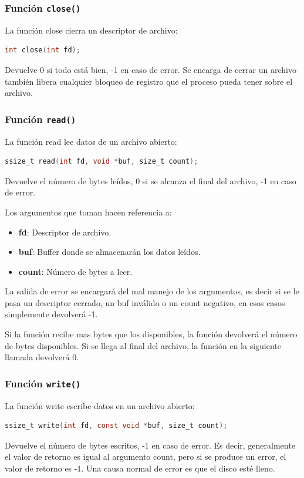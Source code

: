 \documentclass{article}
\begin{document}
\subsubsection{Función \texttt{close()}}
La función close cierra un descriptor de archivo:
\begin{lstlisting}[language=C]
    int close(int fd);
\end{lstlisting}
Devuelve 0 si todo está bien, -1 en caso de error. Se encarga de cerrar un archivo también libera cualquier bloqueo de registro que el proceso pueda tener sobre el archivo.

\subsubsection{Función \texttt{read()}}
La función read lee datos de un archivo abierto:
\begin{lstlisting}[language=C]
    ssize_t read(int fd, void *buf, size_t count);
\end{lstlisting}
Devuelve el número de bytes leídos, 0 si se alcanza el final del archivo, -1 en caso de error.

Los argumentos que toman hacen referencia a:
\begin{itemize}
    \item \textbf{fd}: Descriptor de archivo.
    \item \textbf{buf}: Buffer donde se almacenarán los datos leídos.
    \item \textbf{count}: Número de bytes a leer.
\end{itemize}
La salida de error se encargará del mal manejo de los argumentos, es decir si se le pasa un descriptor cerrado, un buf inválido o un count negativo, en esos casos simplemente devolverá -1.

Si la función recibe mas bytes que los disponibles, la función devolverá el número de bytes disponibles. Si se llega al final del archivo, la función en la siguiente llamada devolverá 0.

\subsubsection{Función \texttt{write()}}
La función write escribe datos en un archivo abierto:
\begin{lstlisting}[language=C]
    ssize_t write(int fd, const void *buf, size_t count);
\end{lstlisting}
Devuelve el número de bytes escritos, -1 en caso de error. Es decir, generalmente el valor de retorno es igual al argumento count, pero si se produce un error, el valor de retorno es -1. Una causa normal de error es que el disco esté lleno.
\end{document}
